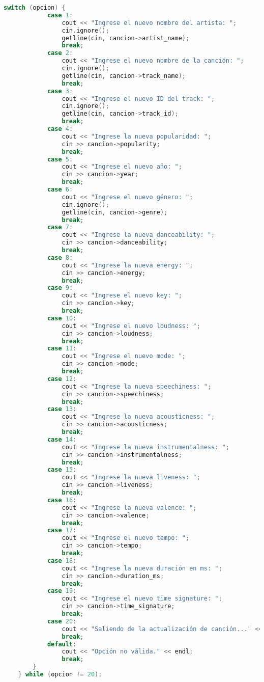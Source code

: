 \documentclass[12pt]{article}
\begin{document}
\begin{flushleft}
\begin{lstlisting}[language=C++, style=mystyle, caption={Cabecera de la Clase Menú}]
        switch (opcion) {
            case 1:
                cout << "Ingrese el nuevo nombre del artista: ";
                cin.ignore();
                getline(cin, cancion->artist_name);
                break;
            case 2:
                cout << "Ingrese el nuevo nombre de la canción: ";
                cin.ignore();
                getline(cin, cancion->track_name);
                break;
            case 3:
                cout << "Ingrese el nuevo ID del track: ";
                cin.ignore();
                getline(cin, cancion->track_id);
                break;
            case 4:
                cout << "Ingrese la nueva popularidad: ";
                cin >> cancion->popularity;
                break;
            case 5:
                cout << "Ingrese el nuevo año: ";
                cin >> cancion->year;
                break;
            case 6:
                cout << "Ingrese el nuevo género: ";
                cin.ignore();
                getline(cin, cancion->genre);
                break;
            case 7:
                cout << "Ingrese la nueva danceability: ";
                cin >> cancion->danceability;
                break;
            case 8:
                cout << "Ingrese la nueva energy: ";
                cin >> cancion->energy;
                break;
            case 9:
                cout << "Ingrese el nuevo key: ";
                cin >> cancion->key;
                break;
            case 10:
                cout << "Ingrese el nuevo loudness: ";
                cin >> cancion->loudness;
                break;
            case 11:
                cout << "Ingrese el nuevo mode: ";
                cin >> cancion->mode;
                break;
            case 12:
                cout << "Ingrese la nueva speechiness: ";
                cin >> cancion->speechiness;
                break;
            case 13:
                cout << "Ingrese la nueva acousticness: ";
                cin >> cancion->acousticness;
                break;
            case 14:
                cout << "Ingrese la nueva instrumentalness: ";
                cin >> cancion->instrumentalness;
                break;
            case 15:
                cout << "Ingrese la nueva liveness: ";
                cin >> cancion->liveness;
                break;
            case 16:
                cout << "Ingrese la nueva valence: ";
                cin >> cancion->valence;
                break;
            case 17:
                cout << "Ingrese el nuevo tempo: ";
                cin >> cancion->tempo;
                break;
            case 18:
                cout << "Ingrese la nueva duración en ms: ";
                cin >> cancion->duration_ms;
                break;
            case 19:
                cout << "Ingrese el nuevo time signature: ";
                cin >> cancion->time_signature;
                break;
            case 20:
                cout << "Saliendo de la actualización de canción..." << endl;
                break;
            default:
                cout << "Opción no válida." << endl;
                break;
        }
    } while (opcion != 20);


\end{lstlisting}
\end{flushleft}
\end{document}
